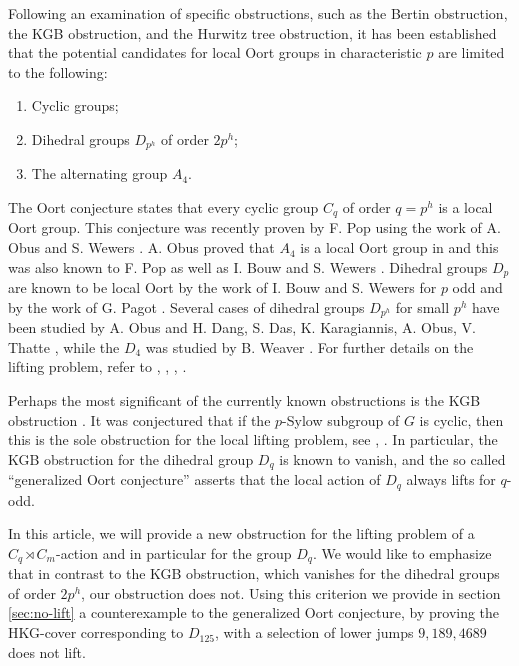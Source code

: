 \documentclass[11pt,letterpaper]{amsart}
\theoremstyle{definition}
\begin{document}
Following an examination of specific obstructions, such as the Bertin obstruction, the KGB obstruction, and the Hurwitz tree obstruction, it has been established that the potential candidates for local Oort groups in characteristic $p$ are limited to the following: 
\begin{enumerate}
\item Cyclic groups;
\item Dihedral groups $D_{p^h}$ of order $2p^h$;
\item The alternating group $A_4$.
\end{enumerate}

The Oort conjecture states that every cyclic group $C_q$ of order $q=p^h$ {is a local Oort group}. This conjecture was recently proven by F. Pop \cite{MR3194816} using the work of A. Obus and S. Wewers \cite{ObusWewers}. A. Obus proved that $A_4$ is a local Oort group in \cite{MR3556796} and this was also known to F. Pop as well as I. Bouw and S. Wewers \cite{MR2254623}. Dihedral groups $D_p$ are known to be local Oort by the work of I. Bouw and S. Wewers for $p$ odd \cite{MR2254623} and by the work of G. Pagot \cite{PagotPhd}. Several cases of dihedral groups $D_{p^h}$ for small $p^h$ have been studied by A. Obus \cite{Obus2017} and H. Dang, S. Das, K. Karagiannis, A. Obus, V. Thatte \cite{MR4450616}, while the $D_4$ was studied by B. Weaver \cite{MR3874854}. For further details on the lifting problem, refer to \cite{MR2441248}, \cite{MR2919977}, \cite{MR3591155}, \cite{Obus12}. 

Perhaps the most significant of the currently known obstructions is the KGB obstruction \cite{MR2919977}. It was conjectured that 
if the $p$-Sylow subgroup of $G$ is cyclic, then this is the sole obstruction for the local lifting problem, see \cite{Obus12}, \cite{Obus2017}. 
In particular, the KGB obstruction for the dihedral group $D_q$ is known to vanish, and the so called ``generalized Oort conjecture'' asserts that the local action of $D_q$ always lifts {for $q$-odd}. 

In this article, we will provide a new obstruction for the lifting problem of a $C_q \rtimes C_m$-action and in particular for the group $D_q$. We would like to emphasize that in contrast to the KGB obstruction, which vanishes for the dihedral groups of order $2p^h$, our obstruction does not.
Using this criterion we provide in section \ref{sec:no-lift} a counterexample to the generalized Oort conjecture, 
by proving 
the HKG-cover corresponding to $D_{125}$, with a selection of lower jumps $9,189,4689$ does not lift. 
 
\end{document}
